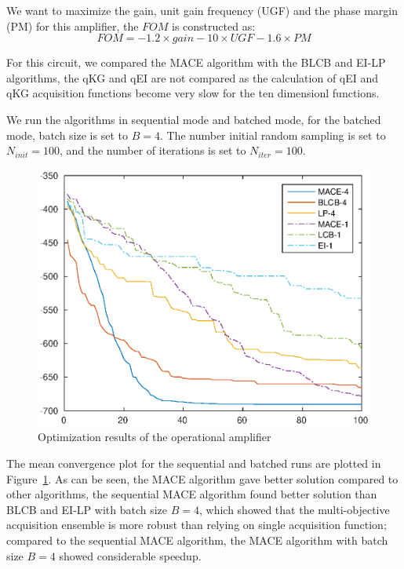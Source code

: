We want to maximize the gain, unit gain frequency (UGF) and the phase margin (PM) for this amplifier, the $FOM$ is constructed as:
$$
\mathit{FOM} = -1.2 \times \mathit{gain} - 10 \times \mathit{UGF} - 1.6 \times \mathit{PM}
$$

For this circuit, we compared the MACE algorithm with the BLCB and EI-LP
algorithms, the qKG and qEI are not compared as the calculation of qEI and qKG
acquisition functions become very slow for the ten dimensionl functions. 

We run the algorithms in sequential mode and batched mode, for the batched
mode, batch size is set to $B = 4$. The number initial random sampling is set
to $N_{init} = 100$, and the number of iterations is set to $N_{iter} = 100$.

\begin{figure}[htbp]
\vskip 0.2in
\begin{center}
\centerline{\includegraphics[width=\columnwidth]{./img/mean_DAC2014.eps}}
\caption{Optimization results of the operational amplifier}
\label{fig:resDAC2014}
\end{center}
\vskip -0.2in
\end{figure}

The mean convergence plot for the sequential and batched runs are plotted in
Figure~\ref{fig:resDAC2014}. As can be seen, the MACE algorithm gave better
solution compared to other algorithms, the sequential MACE algorithm found
better solution than BLCB and EI-LP with batch size $B = 4$, which showed that
the multi-objective acquisition ensemble is more robust than relying on single
acquisition function; compared to the sequential MACE algorithm, the MACE
algorithm with batch size $B = 4$ showed considerable speedup.

